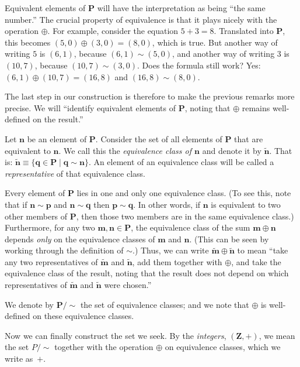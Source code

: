 \documentclass[10pt, a4paper, twocolumn]{article}
\newcommand{\set}[1]{\mathbold{#1}}
\newcommand{\pairs}{\set{P}}
\begin{document}
Equivalent elements of $\pairs$ will have the interpretation as being
``the same number.'' The crucial property of equivalence is that it
plays nicely with the operation $\oplus$. For example, consider the
equation $5+3=8$. Translated into $\pairs$, this becomes
$(5,0)\oplus(3,0)=(8,0)$, which is true. But another way of writing $5$ is
$(6,1)$, because $(6,1)\sim(5,0)$, and another way of writing $3$ is
$(10,7)$, because $(10,7)\sim(3,0)$. Does the formula still work? Yes:
$(6,1)\oplus(10,7)=(16,8)$ and $(16,8)\sim(8,0)$.

The last step in our construction is therefore to make the previous
remarks more precise. We will ``identify equivalent elements of
$\pairs$, noting that $\oplus$ remains well-defined on the result.'' 

Let $\mathbold{n}$ be an element of $\pairs$. Consider the set of all
elements of $\pairs$ that are equivalent to $\mathbold{n}$. We call
this the \emph{equivalence class of $\mathbold{n}$} and denote it by
$\tilde{\mathbold{n}}$. That is: $\tilde{\mathbold{n}} \equiv \{
\mathbold{q}\in\pairs \mid \mathbold{q}\sim\mathbold{n}\}$. An element of an
equivalence class will be called a \emph{representative} of that
equivalence class.

Every element of $\pairs$ lies in one and only one equivalence
class. (To see this, note that if $\mathbold{n}\sim\mathbold{p}$ and
$\mathbold{n}\sim\mathbold{q}$ then $\mathbold{p}\sim\mathbold{q}$. In other
words, if $\mathbold{n}$ is equivalent to two other members of
$\pairs$, then those two members are in the same equivalence class.)
Furthermore, for any two $\mathbold{m},\mathbold{n}\in\pairs$, the
equivalence class of the sum $\mathbold{m}\oplus\mathbold{n}$ depends
\emph{only} on the equivalence classes of $\mathbold{m}$ and
$\mathbold{n}$. (This can be seen by working through the definition of
$\sim$.) Thus, we can write $\tilde{\mathbold{m}}\oplus\tilde{\mathbold{n}}$
to mean ``take any two representatives of $\tilde{\mathbold{m}}$ and
$\tilde{\mathbold{n}}$, add them together with $\oplus$, and take the
equivalence class of the result, noting that the result does not
depend on which representatives of $\tilde{\mathbold{m}}$ and
$\tilde{\mathbold{n}}$ were chosen.''

We denote by $\pairs/{\sim}$ the set of equivalence classes; and we note
that $\oplus$ is well-defined on these equivalence classes.

Now we can finally construct the set we seek. By the \emph{integers},
$(\set{Z}, +)$, we mean the set $P/{\sim}$ together with the operation
$\oplus$ on equivalence classes, which we write as~$+$.
\end{document}
